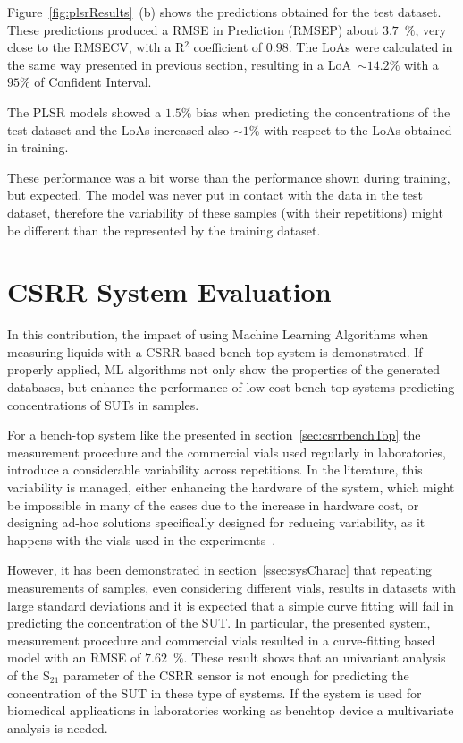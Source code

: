 \documentclass[journal,twoside,web]{ieeecolor}
\begin{document}
Figure~\ref{fig:plsrResults}~(b) shows the predictions obtained for the test dataset. These predictions produced a RMSE in Prediction (RMSEP) about $3.7$~$\%$, very close to the RMSECV, with a R$^{2}$ coefficient of $0.98$. The LoAs were calculated in the same way presented in previous section, resulting in a LoA~$\sim14.2\%$ with a $95\%$ of Confident Interval. 

The PLSR models showed a $1.5\%$ bias when predicting the concentrations of the test dataset and the LoAs increased also $\sim1\%$ with respect to the LoAs obtained in training. 

These performance was a bit worse than the performance shown during training, but expected. The model was never put in contact with the data in the test dataset, therefore the variability of these samples (with their repetitions) might be different than the represented by the training dataset.

\section{CSRR System Evaluation}
\label{sec:csrrEval}

In this contribution, the impact of using Machine Learning Algorithms when measuring liquids with a CSRR based bench-top system is demonstrated. If properly applied, ML algorithms not only show the properties of the generated databases, but enhance the performance of low-cost bench top systems predicting concentrations of SUTs in samples.

For a bench-top system like the presented in section~\ref{sec:csrrbenchTop} the measurement procedure and the commercial vials used regularly in laboratories, introduce a considerable variability across repetitions. In the literature, this variability is managed, either enhancing the hardware of the system, which might be impossible in many of the cases due to the increase in hardware cost, or designing ad-hoc solutions specifically designed for reducing variability, as it happens with the vials used in the experiments~\cite{Omer2020, Omer2021}. 

However, it has been demonstrated in section~\ref{ssec:sysCharac} that repeating measurements of samples, even considering different vials, results in datasets with large standard deviations and it is expected that a simple curve fitting will fail in predicting the concentration of the SUT. In particular, the presented system, measurement procedure and commercial vials resulted in a curve-fitting based model with an RMSE of $7.62$~$\%$. These result shows that an univariant analysis of the S$_{21}$ parameter of the CSRR sensor is not enough for predicting the concentration of the SUT in these type of systems. If the system is used for biomedical applications in laboratories working as benchtop device a multivariate analysis is needed. 
\end{document}
